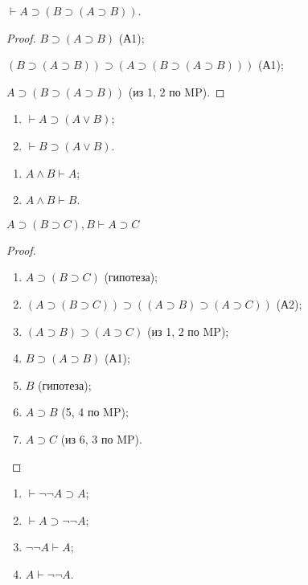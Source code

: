 \begin{lemma}
    $\vdash A \supset (B \supset (A \supset B))$.
\end{lemma}
\begin{proof}
    \item $B \supset (A \supset B)$ (А1);
    \item $(B \supset (A \supset B)) \supset (A \supset (B \supset (A \supset B)))$ (А1);
    \item $A \supset (B \supset (A \supset B))$ (из 1, 2 по MP).
\end{proof}
\begin{lemma}\leavevmode
    \begin{enumerate}
        \item $\vdash A \supset (A \lor B)$;
        \item $\vdash B \supset (A \lor B)$.
    \end{enumerate}
\end{lemma}
\begin{lemma}\leavevmode
    \begin{enumerate}
        \item $A \land B \vdash A$;
        \item $A \land B \vdash B$.
    \end{enumerate}
\end{lemma}
\begin{lemma}\label{th:double_implication}
    $A \supset (B \supset C), B \vdash A \supset C$
\end{lemma}
\begin{proof}\leavevmode
    \begin{enumerate}
        \item $A \supset (B \supset C)$ (гипотеза);
        \item $(A \supset (B \supset C)) \supset ((A \supset B) \supset (A \supset C))$ (А2);
        \item $(A \supset B) \supset (A \supset C)$ (из 1, 2 по MP);
        \item $B \supset (A \supset B)$ (А1);
        \item $B$ (гипотеза);
        \item $A \supset B$ (5, 4 по MP);
        \item $A \supset C$ (из 6, 3 по MP).
    \end{enumerate}
\end{proof}
\begin{lemma}\leavevmode
    \begin{enumerate}
        \item $\vdash \neg\neg A \supset A$;
        \item $\vdash A \supset \neg\neg A$;
        \item $\neg\neg A \vdash A$;
        \item $A \vdash \neg\neg A$.
    \end{enumerate}
\end{lemma}
